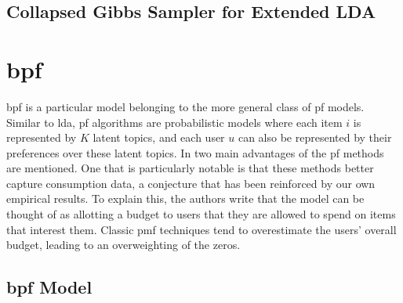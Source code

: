 \documentclass{article} %
\begin{document}
\subsection{Collapsed Gibbs Sampler for Extended LDA}

\section{\acrlong{bpf}}
\acrlong{bpf} is a particular model belonging to the more general class of \gls{pf} models. Similar to \gls{lda}, \gls{pf} algorithms are probabilistic models where each item $i$ is represented by $K$ latent topics, and each user $u$ can also be represented by their preferences over these latent topics. In \citep{gopalan2013scalable} two main advantages of the \gls{pf} methods are mentioned. One that is particularly notable is that these methods better capture consumption data, a conjecture that has been reinforced by our own empirical results. To explain this, the authors write that the model can be thought of as allotting a budget to users that they are allowed to spend on items that interest them. Classic \gls{pmf} techniques tend to overestimate the users' overall budget, leading to an overweighting of the zeros.

\subsection{\acrlong{bpf} Model}
\end{document}
